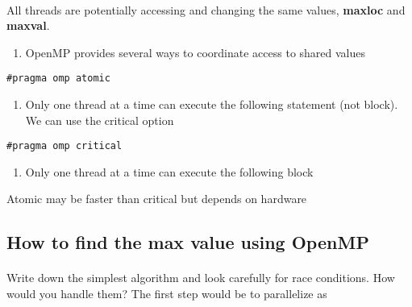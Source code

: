 \documentclass[%
oneside,                 %
final,                   %
10pt]{article}
\begin{document}
\paragraph{}
All threads are potentially accessing and changing the same values, \textbf{maxloc} and \textbf{maxval}.
\begin{enumerate}
\item OpenMP provides several ways to coordinate access to shared values
\end{enumerate}

\noindent


\begin{verbatim}
#pragma omp atomic

\end{verbatim}

\begin{enumerate}
\item Only one thread at a time can execute the following statement (not block). We can use the critical option
\end{enumerate}

\noindent


\begin{verbatim}
#pragma omp critical

\end{verbatim}

\begin{enumerate}
\item Only one thread at a time can execute the following block
\end{enumerate}

\noindent
Atomic may be faster than critical but depends on hardware



\subsection*{How to find the max value using OpenMP}

\paragraph{}
Write down the simplest algorithm and look carefully for race conditions. How would you handle them? 
The first step would be to parallelize as 
\end{document}
